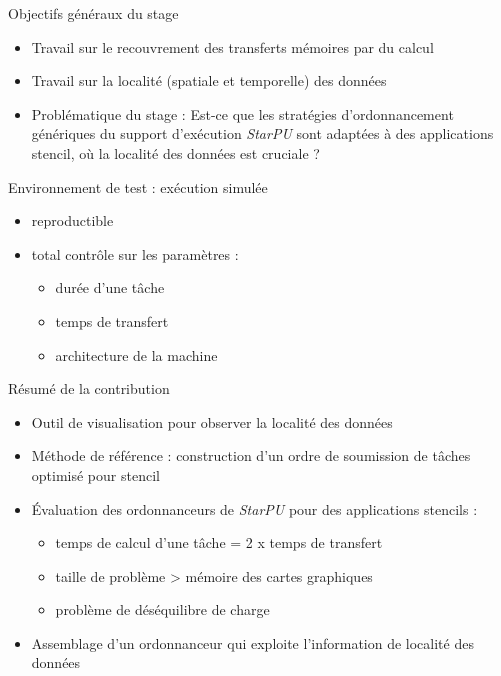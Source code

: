 \documentclass[9pt]{beamer}
\begin{document}
\begin{frame}{\textcolor{inriaGrey}{Objectifs généraux du stage}}
  \vfill
  \begin{itemize}
  \item<1-> Travail sur le recouvrement des transferts mémoires par du calcul
    \vfill
  \item<2-> Travail sur la localité (spatiale et temporelle) des données \vfill
  \item<3-> Problématique du stage : \newline Est-ce que les stratégies
    d'ordonnancement génériques du support d'exécution \textit{StarPU} sont
    adaptées à des applications stencil, où la localité des données est
    cruciale ?
  \end{itemize}
  \vfill
\end{frame}

\begin{frame}{\textcolor{inriaGrey}{Environnement de test : exécution simulée}}
    \begin{itemize}
    \item reproductible \vfill
    \item total contrôle sur les paramètres : \vfill
      \begin{itemize}
      \item durée d'une tâche \vfill
      \item temps de transfert \vfill
      \item architecture de la machine
      \end{itemize}
    \end{itemize}
\end{frame}

\begin{frame}{\textcolor{inriaGrey}{Résumé de la contribution}}
  \vfill
  \begin{itemize}
  \item<1-> Outil de visualisation pour observer la localité des données
    \vfill
  \item<2-> Méthode de référence : construction d'un ordre de soumission de
    tâches optimisé pour stencil \vfill
  \item<3-> Évaluation des ordonnanceurs de \textit{StarPU} pour des
    applications stencils : \vfill
    \begin{itemize}
    \item<4-> temps de calcul d'une tâche = 2 x temps de transfert \vfill
    \item<5-> taille de problème > mémoire des cartes graphiques \vfill
    \item<6-> problème de déséquilibre de charge
    \end{itemize}
    \vfill
  \item<7-> Assemblage d'un ordonnanceur qui exploite l'information de localité
    des données
  \end{itemize}
  \vfill
\end{frame}
\end{document}
